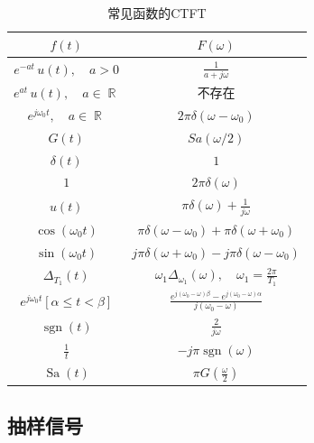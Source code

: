 \documentclass{ctexart}
\DeclareMathOperator{\Rset}{\mathbb{R}}
\DeclareMathOperator{\sgn}{\mathrm{sgn}}
\DeclareMathOperator{\Sa}{\mathrm{Sa}}
\begin{document}
    \begin{table}[ht!]
        \centering
        \begin{tabular}{|c|c|}
                \hline $\displaystyle f(t)$ & $\displaystyle F(\omega)$ \\ \hline
                $\displaystyle e^{-at}\,u(t),\quad a > 0$ & $\displaystyle \frac{1}{a + j \omega}$ \\ \hline
                $\displaystyle e^{at}\,u(t),\quad a \in \Rset$ & 不存在 \\ \hline
                $\displaystyle e^{j \omega_0 t},\quad a \in \Rset$ & $\displaystyle 2 \pi \delta(\omega - \omega_0)$ \\ \hline
                $\displaystyle G(t)$ & $\displaystyle Sa(\omega / 2)$ \\ \hline
                $\displaystyle \delta(t)$ & $\displaystyle 1$ \\ \hline
                $\displaystyle 1$ & $\displaystyle 2\pi \delta(\omega)$ \\ \hline
                $\displaystyle u(t)$ & $\displaystyle \pi\delta(\omega) + \frac{1}{j\omega}$ \\ \hline
                $\displaystyle \cos (\omega_0 t)$ & $\displaystyle \pi \delta(\omega - \omega_0) + \pi \delta(\omega + \omega_0)$ \\ \hline
                $\displaystyle \sin (\omega_0 t)$ & $\displaystyle j \pi \delta(\omega + \omega_0) - j \pi \delta(\omega - \omega_0)$ \\ \hline
                $\displaystyle \Delta_{T_1} (t)$ & $\displaystyle \omega_1 \Delta_{\omega_1}(\omega),\quad \omega_1 = \frac{2\pi}{T_1}$ \\ \hline
                $\displaystyle e^{j \omega_0 t} [\alpha \le t < \beta]$ & $\displaystyle \frac{e^{j(\omega_0 - \omega)\beta} - e^{j(\omega_0-\omega)\alpha}}{j (\omega_0 - \omega)}$ \\ \hline
                $\displaystyle \sgn(t)$ & $\displaystyle \frac{2}{j\omega}$\\\hline
                $\displaystyle \frac{1}{t}$ & $\displaystyle -j \pi \sgn(\omega)$\\\hline
                $\displaystyle \Sa(t)$ & $\displaystyle \pi G \left( \frac{\omega}{2} \right) $\\ \hline
        \end{tabular}
        \caption{常见函数的CTFT}
    \end{table}

\subsection{抽样信号}
\end{document}

